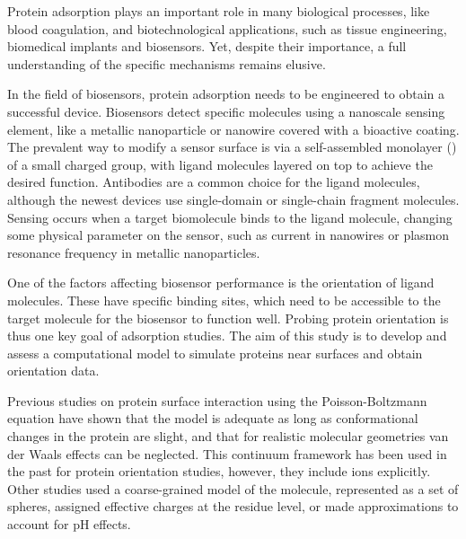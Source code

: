
Protein adsorption plays an important role in many biological processes, like blood coagulation, and biotechnological applications, such as tissue engineering, biomedical implants and biosensors.
Yet, despite their importance, a full understanding of the specific mechanisms remains elusive.\cite{Gray2004,RabeVerdesSeegel2011}

In the field of biosensors, protein adsorption needs to be engineered to obtain a successful device. 
Biosensors detect specific molecules using a nanoscale sensing element, like a metallic nanoparticle or nanowire covered with a bioactive coating. 
The prevalent way to modify a sensor surface is via a self-assembled monolayer (\sam) of a small charged group, with ligand molecules layered on top to achieve the desired function. 
Antibodies are a common choice for the ligand molecules, although the newest devices use single-domain or single-chain fragment molecules.\cite{ByunETal2013,TrillingETal2014} 
Sensing occurs when a target biomolecule binds to the ligand molecule,  changing some physical parameter on the sensor, such as current in nanowires or plasmon resonance frequency in metallic nanoparticles. 

One of the factors affecting biosensor performance is the orientation of ligand molecules.\cite{TajimaTakaiIshihara2011,TrillingBeekwilderZuilhof2013} 
These have specific binding sites, which need to be accessible to the target molecule for the biosensor to function well.
Probing protein orientation is thus one key goal of adsorption studies.
The aim of this study is to develop and assess a computational model to simulate proteins near surfaces and obtain orientation data.

Previous studies on protein surface interaction using the Poisson-Boltzmann equation have shown that the model is adequate as long as conformational changes in the protein are slight,\cite{YaoLenhoff2004,YaoLenhoff2005} and that for realistic molecular geometries van der Waals effects can be neglected.\cite{RothNealLenhoff1996}
This continuum framework has been used in the past for protein orientation studies,\cite{JufferArgosDevlieg1996} however, they include ions explicitly. Other studies used a coarse-grained model of the molecule, represented as  a set of spheres,\cite{ShengTsaoZhouJiang2002,ZhouTsaoShengJiang2004} assigned effective charges at the residue level,\cite{FreedCramer2011,ZhouChenJiang2003} or made approximations to account for pH effects.\cite{BiesheuvelvanderVeenNord2005,HartvigdeWeertOstergaartJorgensenJensen2011}

